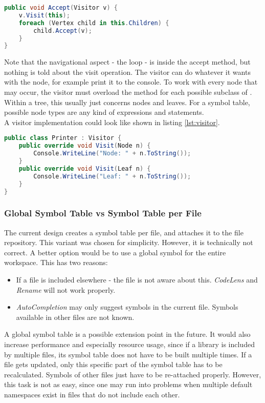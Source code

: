 \begin{lstlisting}[language=csharp, caption={Standard-Implementation of Accept}, captionpos=b, label={lst:accept}]
public void Accept(Visitor v) {
    v.Visit(this);
    foreach (Vertex child in this.Children) {
        child.Accept(v);
    }
}
\end{lstlisting}

Note that the navigational aspect - the  loop - is inside the accept method, but nothing is told about the visit operation.
The visitor can do whatever it wants with the node, for example print it to the console.
To work with every node that may occur, the visitor must overload the  method for each possible subclass of .
Within a tree, this usually just concerns nodes and leaves.
For a symbol table, possible node types are any kind of expressions and statements.\\

A visitor implementation could look like shown in listing \ref{lst:visitor}.

\begin{lstlisting}[language=csharp, caption={Example for a Visitor}, captionpos=b, label={lst:visitor}]
public class Printer : Visitor {
    public override void Visit(Node n) {
        Console.WriteLine("Node: " + n.ToString());
    }
    public override void Visit(Leaf n) {
        Console.WriteLine("Leaf: " + n.ToString());
    }
}
\end{lstlisting}

\subsubsection{Global Symbol Table vs Symbol Table per File}
\label{section:globalSymbolTable}
The current design creates a symbol table per file, and attaches it to the file repository.
This variant was chosen for simplicity.
However, it is technically not correct.
A better option would be to use a global symbol for the entire workspace.
This has two reasons:
\begin{itemize}
    \item If a file is included elsewhere - the file is not aware about this. \textit{CodeLens} and \textit{Rename} will not work properly.
    \item \textit{AutoCompletion} may only suggest symbols in the current file. Symbols available in other files are not known.
\end{itemize}

A global symbol table is a possible extension point in the future.
It would also increase performance and especially resource usage, since if a library is included by multiple files, its symbol table does not have to be built multiple times.
If a file gets updated, only this specific part of the symbol table has to be recalculated. Symbols of other files just have to be re-attached properly.
However, this task is not as easy, since one may run into problems when multiple default namespaces exist in files that do not include each other.\\


